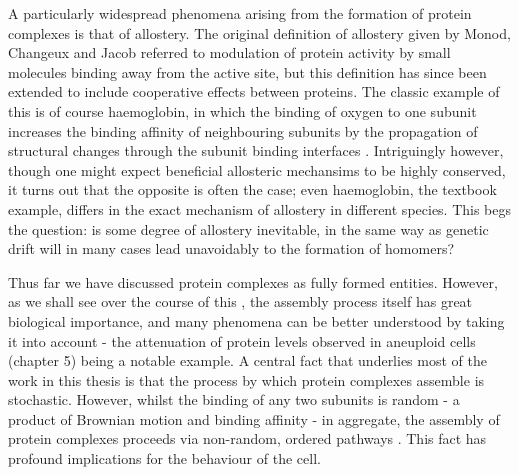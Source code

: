\documentclass[a4paper,11pt,twoside,openright]{scrbook}
\let\cite\supercite
\begin{document}
A particularly widespread phenomena arising from the formation of protein complexes is that of allostery. The original definition of allostery given by Monod, Changeux and Jacob \cite{Monod1963} referred to modulation of protein activity by small molecules binding away from the active site, but this definition has since been extended to include cooperative effects between proteins. The classic example of this is of course haemoglobin, in which the binding of oxygen to one subunit increases the binding affinity of neighbouring subunits by the propagation of structural changes through the subunit binding interfaces \cite{Perutz1976}. Intriguingly however, though one might expect beneficial allosteric mechansims to be highly conserved, it turns out that the opposite is often the case; even haemoglobin, the textbook example, differs in the exact mechanism of allostery in different species. This begs the question: is some degree of allostery inevitable, in the same way as genetic drift will in many cases lead unavoidably to the formation of homomers?

Thus far we have discussed protein complexes as fully formed entities. However, as we shall see over the course of this , the assembly process itself has great biological importance, and many phenomena can be better understood by taking it into account - the attenuation of protein levels observed in aneuploid cells (chapter 5) being a notable example. A central fact that underlies most of the work in this thesis is that the process by which protein complexes assemble is stochastic. However, whilst the binding of any two subunits is random - a product of Brownian motion and binding affinity - in aggregate, the assembly of protein complexes proceeds via non-random, ordered pathways \cite{Marsh2013}. This fact has profound implications for the behaviour of the cell.
\end{document}
